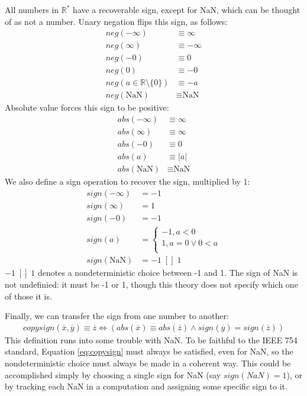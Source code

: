 \documentclass[letterpaper,10pt]{article}
\newcommand{\NaN}{\text{NaN}}
\begin{document}
 All numbers in $\mathbb{R}^*$ have a recoverable sign, except for NaN, which can be thought of as not a number. Unary negation flips this sign, as follows:
\begin{align}
 neg(-\infty) &\equiv \infty \\
 neg(\infty) &\equiv -\infty \\
 neg(-0) &\equiv 0 \\
 neg(0) &\equiv -0 \\
 neg(a \in \mathbb{R} \setminus \{0\}) &\equiv -a \\
 neg(\NaN) &\equiv \NaN
\end{align}
 Absolute value forces this sign to be positive:
\begin{align}
 abs(-\infty) &\equiv \infty \\
 abs(\infty) &\equiv \infty \\
 abs(-0) &\equiv 0 \\
 abs(a) &\equiv |a| \\
 abs(\NaN) &\equiv \NaN
\end{align}
 We also define a sign operation to recover the sign, multiplied by 1:
\begin{align}
 sign(-\infty) &= -1 \\
 sign(\infty) &= 1 \\
 sign(-0) &= -1 \\
 sign(a) &=
 \begin{cases}
  -1, a < 0 \\
  1, a = 0 \lor 0 < a \\
 \end{cases}\\
 sign(\NaN) &= -1 \;[]\; 1
\end{align}
 $-1 \;[]\; 1$ denotes a nondeterministic choice between -1 and 1. The sign of NaN is not undefinied: it must be -1 or 1, though this theory does not specify which one of those it is.
 
 Finally, we can transfer the sign from one number to another:
\begin{align}
 copysign(\overline{x}, \overline{y}) \equiv \overline{z} \iff (abs(\overline{x}) \equiv abs(\overline{z}) \land sign(\overline{y}) = sign(\overline{z})) \label{eq:copysign}
\end{align}
This definition runs into some trouble with NaN. To be faithful to the IEEE 754 standard, Equation \ref{eq:copysign} must always be satisfied, even for NaN, so the nondeterministic choice must always be made in a coherent way. This could be accomplished simply by choosing a single sign for NaN (say $sign(NaN) = 1$), or by tracking each NaN in a computation and assigning some specific sign to it.
\end{document}
